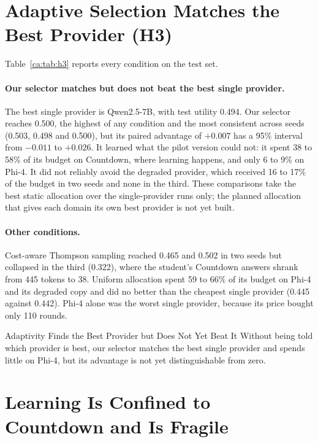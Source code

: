\section{Adaptive Selection Matches the Best Provider (H3)}
\label{ca:sec:h3}

Table~\ref{ca:tab:h3} reports every condition on the test set.



\paragraph{Our selector matches but does not beat the best single provider.} The best
single provider is Qwen2.5-7B, with test utility 0.494. Our selector reaches 0.500, the
highest of any condition and the most consistent across seeds (0.503, 0.498 and 0.500), but
its paired advantage of $+0.007$ has a 95\% interval from $-0.011$ to $+0.026$. It learned
what the pilot version could not: it spent 38 to 58\% of its budget on Countdown, where
learning happens, and only 6 to 9\% on Phi-4. It did not reliably avoid the degraded
provider, which received 16 to 17\% of the budget in two seeds and none in the third. These
comparisons take the best static allocation over the single-provider runs only; the planned
allocation that gives each domain its own best provider is not yet built.

\paragraph{Other conditions.} Cost-aware Thompson sampling reached 0.465 and 0.502 in two
seeds but collapsed in the third (0.322), where the student's Countdown answers shrank from
445 tokens to 38. Uniform allocation spent 59 to 66\% of its budget on Phi-4 and its
degraded copy and did no better than the cheapest single provider (0.445 against 0.442).
Phi-4 alone was the worst single provider, because its price bought only 110 rounds.

\begin{takeaway}{Adaptivity Finds the Best Provider but Does Not Yet Beat It}
\label{ca:tk:h3}
Without being told which provider is best, our selector matches the best single provider
and spends little on Phi-4, but its advantage is not yet distinguishable from zero.
\end{takeaway}

\section{Learning Is Confined to Countdown and Is Fragile}
\label{ca:sec:countdown}

